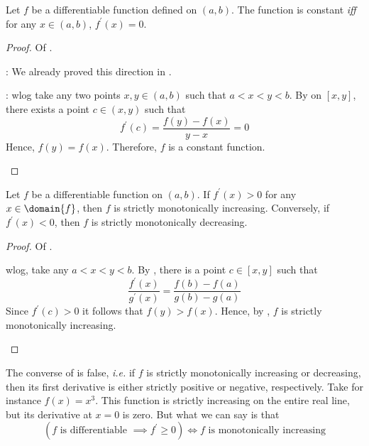\begin{thm}\label{thm-differentiable-constant-zero}
	Let $f$ be a differentiable function defined on $(a,b)$. The function is constant
	\textit{iff} for any $x\in(a,b)$, $f^\prime(x)=0$.
\end{thm}

\begin{proof}
	Of .
	\begin{flushleft}
		\proofright: We already proved this direction in .
	\end{flushleft}
	\begin{flushleft}
		\proofleft: \gls{wlog} take any two points $x,y\in(a,b)$ such that $a<x<y<b$.
		By  on $[x,y]$, there exists a point
		$c\in(x,y)$ such that
		\begin{equation*}
			f^\prime(c) = \frac{f(y)-f(x)}{y-x} = 0
		\end{equation*}
		Hence, $f(y)=f(x)$. Therefore, $f$ is a constant function.
	\end{flushleft}
\end{proof}

\begin{thm}\label{thm-differentiable-strictly-monotone}
	Let $f$ be a differentiable function on $(a,b)$. If $f^\prime(x)>0$ for any
	$x\in\domain{f}$, then $f$ is strictly monotonically increasing. Conversely,
	if $f^\prime(x)<0$, then $f$ is strictly monotonically decreasing.
\end{thm}

\begin{proof}
	Of \pref{theorem}{thm-differentiable-strictly-monotone}.
	\begin{flushleft}
		\gls{wlog}, take any $a<x<y<b$. By \pref{theorem}{thm-mean-value-theorem},
		there is a point $c\in[x,y]$ such that
		\begin{equation}
			\frac{f^\prime(x)}{g^\prime(x)}=\frac{f(b)-f(a)}{g(b)-g(a)}
		\end{equation}
		Since $f^\prime(c)>0$ it follows that $f(y)>f(x)$. Hence, by
		, $f$ is strictly monotonically increasing.
	\end{flushleft}
\end{proof}

\begin{rem}\label{rem-differentiable-strictly-monotone}
	The converse of  is false,
	\textit{i.e.} if $f$ is strictly monotonically increasing or decreasing, then its
	first derivative is either strictly positive or negative, respectively. Take for
	instance $f(x)=x^3$. This function is strictly increasing on the entire real line,
	but its derivative at $x=0$ is zero. But what we can say is that
	\begin{equation}\label{eq-differentiable-strictly-monotone}
		\left(f\text{ is differentiable } \implies f^\prime\geq0\right)
		\iff f\text{ is monotonically increasing}
	\end{equation}
\end{rem}

